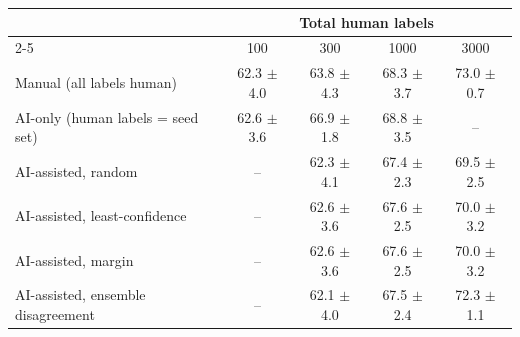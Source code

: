 \begin{tabular}{lcccc}
\toprule
 & \multicolumn{4}{c}{Total human labels} \\
\cmidrule(lr){2-5}
 & 100 & 300 & 1000 & 3000 \\
\midrule
Manual (all labels human) & 62.3 $\pm$ 4.0 & 63.8 $\pm$ 4.3 & 68.3 $\pm$ 3.7 & 73.0 $\pm$ 0.7 \\
AI-only (human labels = seed set) & 62.6 $\pm$ 3.6 & 66.9 $\pm$ 1.8 & 68.8 $\pm$ 3.5 & -- \\
AI-assisted, random & -- & 62.3 $\pm$ 4.1 & 67.4 $\pm$ 2.3 & 69.5 $\pm$ 2.5 \\
AI-assisted, least-confidence & -- & 62.6 $\pm$ 3.6 & 67.6 $\pm$ 2.5 & 70.0 $\pm$ 3.2 \\
AI-assisted, margin & -- & 62.6 $\pm$ 3.6 & 67.6 $\pm$ 2.5 & 70.0 $\pm$ 3.2 \\
AI-assisted, ensemble disagreement & -- & 62.1 $\pm$ 4.0 & 67.5 $\pm$ 2.4 & 72.3 $\pm$ 1.1 \\
\bottomrule
\end{tabular}
